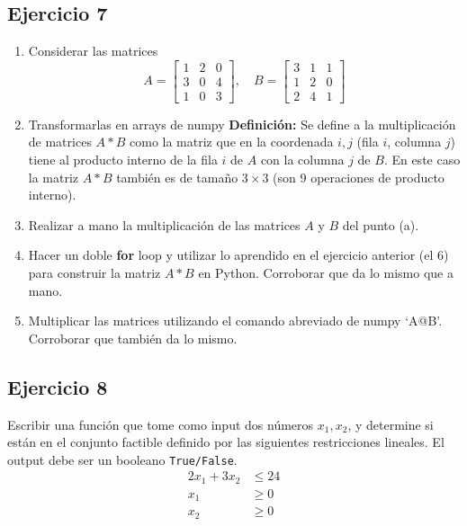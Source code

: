 \documentclass[12pt]{article}
\begin{document}
\subsection{Ejercicio 7}
\begin{enumerate}[label=\alph*)]
    \item Considerar las matrices
    \[
    A = \begin{bmatrix}
    1 & 2 & 0\\[4pt]
    3 & 0 & 4\\[4pt]
    1 & 0 & 3
    \end{bmatrix}, \quad
    B = \begin{bmatrix}
    3 & 1 & 1\\[4pt]
    1 & 2 & 0\\[4pt]
    2 & 4 & 1
    \end{bmatrix}
    \]
    \item Transformarlas en arrays de numpy
    \textbf{Definición:} Se define a la multiplicación de matrices $A*B$ como la matriz que en la coordenada $i,j$ (fila $i$, columna $j$) tiene al producto interno de la fila $i$ de $A$ con la columna $j$ de $B$. En este caso la matriz $A*B$ también es de tamaño $3 \times 3$ (son 9 operaciones de producto interno).
    \item Realizar a mano la multiplicación de las matrices $A$ y $B$ del punto (a).
    \item Hacer un doble \textbf{for} loop y utilizar lo aprendido en el ejercicio anterior (el 6) para construir la matriz $A*B$ en Python. Corroborar que da lo mismo que a mano.
    \item Multiplicar las matrices utilizando el comando abreviado de numpy `A@B'. Corroborar que también da lo mismo.
\end{enumerate}
    
\subsection{Ejercicio 8}
Escribir una función que tome como input dos números $x_1, x_2$, y determine si están en el conjunto factible definido por las siguientes restricciones lineales. El output debe ser un booleano \texttt{True/False}.\\[0.5em]
    \[
    \begin{aligned}
        2x_1 + 3x_2 &\leq 24 \\
        x_1 &\geq 0 \\
        x_2 &\geq 0
        \end{aligned}
    \]
\end{document}
